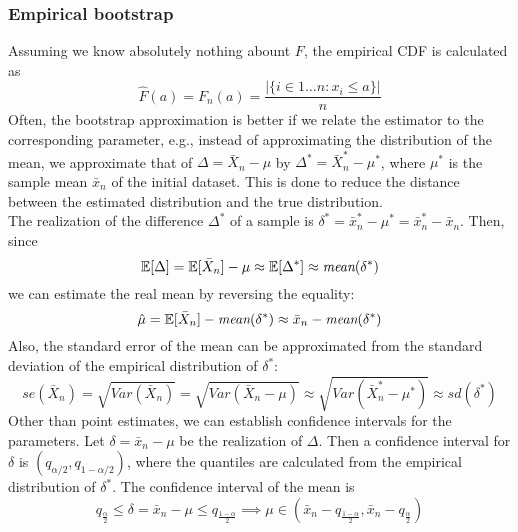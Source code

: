 \subsubsection{Empirical bootstrap}
Assuming we know absolutely nothing abount $F$, the empirical CDF is calculated as
\begin{equation*}
    \hat{F}(a) = F_n(a) = \frac{|\{i \in 1 \ldots n : x_i \leq a\}|}{n}
\end{equation*}
Often, the bootstrap approximation is better if we relate the estimator to the corresponding parameter, e.g., instead of approximating the distribution of the mean, we approximate that of $\Delta = \bar{X}_n - \mu$ by $\Delta^* = \bar{X}_n^* - \mu^*$, where $\mu^*$ is the sample mean $\bar{x}_n$ of the initial dataset. This is done to reduce the distance between the estimated distribution and the true distribution. \\
The realization of the difference $\Delta^*$ of a sample is $\delta^* = \bar{x}_n^* - \mu^* = \bar{x}_n^* - \bar{x}_n$. Then, since
\begin{equation*}
    \mathbb{E}[\Delta] = \mathbb{E}[\bar{X}_n] - \mu \approx \mathbb{E}[\Delta^*] \approx \textit{mean}(\delta^*)
\end{equation*}
we can estimate the real mean by reversing the equality:
\begin{equation*}
    \hat{\mu} = \mathbb{E}[\bar{X}_n] - \textit{mean}(\delta^*) \approx \bar{x}_n - \textit{mean}(\delta^*)
\end{equation*}
Also, the standard error of the mean can be approximated from the standard deviation of the empirical distribution of $\delta^*$:
\begin{equation*}
    se(\bar{X}_n) = \sqrt{Var(\bar{X}_n)} = \sqrt{Var(\bar{X}_n - \mu)} \approx \sqrt{Var(\bar{X}_n^* - \mu^*)} \approx sd(\delta^*)
\end{equation*}
Other than point estimates, we can establish confidence intervals for the parameters. Let $\delta = \bar{x}_n - \mu$ be the realization of $\Delta$. Then a confidence interval for $\delta$ is $(q_{{\alpha}/2}, q_{1-\alpha/2})$, where the quantiles are calculated from the empirical distribution of $\delta^*$. The confidence interval of the mean is
\begin{equation*}
    q_{\frac{\alpha}{2}} \leq \delta = \bar{x}_n - \mu \leq q_{\frac{1-\alpha}{2}} \implies \mu \in (\bar{x}_n - q_{\frac{1-\alpha}{2}}, \bar{x}_n - q_{\frac{\alpha}{2}})
\end{equation*}

